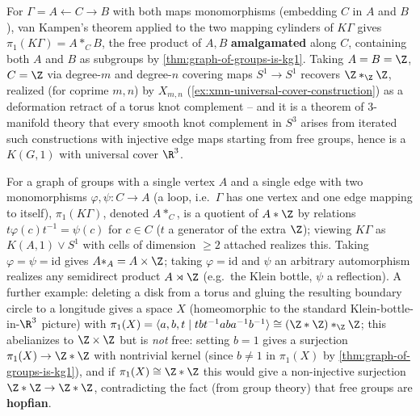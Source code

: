 \begin{example}
\label{ex:free-product-with-amalgamation}
For $\Gamma = A \leftarrow C \to B$ with both maps monomorphisms (embedding $C$ in
$A$ and $B$), van Kampen's theorem applied to the two mapping cylinders of $K\Gamma$
gives $\pi_1(K\Gamma) = A *_C B$, the free product of $A,B$ \textbf{amalgamated} along $C$,
containing both $A$ and $B$ as subgroups by \cref{thm:graph-of-groups-is-kg1}. Taking
$A=B=\Z$, $C=\Z$ via degree-$m$ and degree-$n$ covering maps $S^1\to S^1$
recovers $\Z *_\Z \Z$, realized (for coprime $m,n$) by $X_{m,n}$
(\cref{ex:xmn-universal-cover-construction}) as a deformation retract of a torus knot
complement -- and it is a theorem of 3-manifold theory that every smooth knot
complement in $S^3$ arises from iterated such constructions with injective edge maps
starting from free groups, hence is a $K(G,1)$ with universal cover $\R^3$.
\end{example}

\begin{example}
\label{ex:hnn-extension}
For a graph of groups with a single vertex $A$ and a single edge with two
monomorphisms $\varphi,\psi:C\to A$ (a loop, i.e.\ $\Gamma$ has one vertex and one edge
mapping to itself), $\pi_1(K\Gamma)$, denoted $A*_C$, is a quotient of $A*\Z$ by relations
$t\varphi(c)t^{-1}=\psi(c)$ for $c\in C$ ($t$ a generator of the extra $\Z$); viewing $K\Gamma$ as
$K(A,1)\vee S^1$ with cells of dimension $\ge 2$ attached realizes this. Taking
$\varphi=\psi=\mathrm{id}$ gives $A*_A = A\times\Z$; taking $\varphi=\mathrm{id}$ and $\psi$ an arbitrary
automorphism realizes any semidirect product $A\rtimes\Z$ (e.g.\ the Klein bottle,
$\psi$ a reflection). A further example: deleting a disk from a torus and gluing the
resulting boundary circle to a longitude gives a space $X$ (homeomorphic to the
standard Klein-bottle-in-$\R^3$ picture) with
$\pi_1(X) = \langle a,b,t \mid tbt^{-1}aba^{-1}b^{-1}\rangle \cong (\Z*\Z)*_\Z\Z$; this abelianizes to
$\Z\times\Z$ but is \emph{not} free: setting $b=1$ gives a surjection
$\pi_1(X)\to\Z*\Z$ with nontrivial kernel (since $b\ne 1$ in $\pi_1(X)$ by
\cref{thm:graph-of-groups-is-kg1}), and if $\pi_1(X)\cong\Z*\Z$ this would give a
non-injective surjection $\Z*\Z\to\Z*\Z$, contradicting the fact (from group theory)
that free groups are \textbf{hopfian}.
\end{example}

